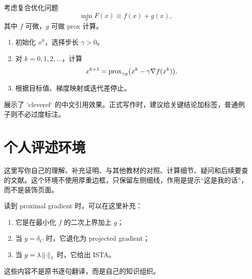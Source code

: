 \documentclass[../main.tex]{subfiles}
\begin{document}
\begin{algorithm}[近端梯度法]
考虑复合优化问题
\[
  \min_x F(x)\equiv f(x)+g(x),
\]
其中 $f$ 可微，$g$ 可做 prox 计算。
\begin{enumerate}[label=(\alph*)]
  \item 初始化 $x^0$，选择步长 $\gamma>0$。
  \item 对 $k=0,1,2,\ldots$，计算
  \[
    x^{k+1}=\operatorname{prox}_{\gamma g}\bigl(x^k-\gamma\nabla f(x^k)\bigr).
  \]
  \item 根据目标值、梯度映射或迭代差停止。
\end{enumerate}
\end{algorithm}

\begin{remark}[交叉引用]
 展示了 `cleveref` 的中文引用效果。正式写作时，建议给关键结论加标签，普通例子则不必过度标注。
\end{remark}

\section{个人评述环境}

\begin{note}
这里写你自己的理解、补充证明、与其他教材的对照、计算细节、疑问和后续要查的文献。这个环境不使用厚重边框，只保留左侧细线，作用是提示“这是我的话”，而不是装饰页面。
\end{note}

\begin{note}
读到 proximal gradient 时，可以在这里补充：
\begin{enumerate}
  \item 它是在最小化 $f$ 的二次上界加上 $g$；
  \item 当 $g=\delta_C$ 时，它退化为 projected gradient；
  \item 当 $g=\lambda\left\lVert \cdot \right\rVert_1$ 时，它给出 ISTA。
\end{enumerate}
这些内容不是原书逐句翻译，而是自己的知识组织。
\end{note}
\end{document}

